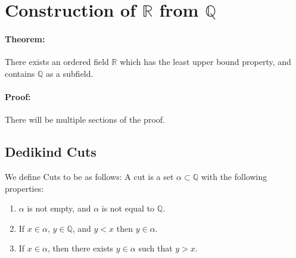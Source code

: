 \documentclass[12pt, oneside]{book}
\begin{document}
\section{Construction of \(\mathbb{R}\) from \(\mathbb{Q}\)}
\paragraph{Theorem:}There exists an ordered field \(\mathbb{R}\) which has the least upper bound property, and contains \(\mathbb{Q}\) as a subfield.
\paragraph{Proof:} There will be multiple sections of the proof.
\subsection{Dedikind Cuts}
We define Cuts to be as follows:
A cut is a set \(\alpha \subset \mathbb{Q}\) with the following properties:
\begin{enumerate}
	\item \(\alpha\) is not empty, and \(\alpha\) is not equal to \(\mathbb{Q}\).
	\item If \(x \in \alpha\), \(y \in \mathbb{Q}\), and \(y<x\) then \(y \in \alpha\).
	\item If \(x \in \alpha\), then there exists \(y \in \alpha\) such that \(y>x\).
\end{enumerate}
\end{document}
